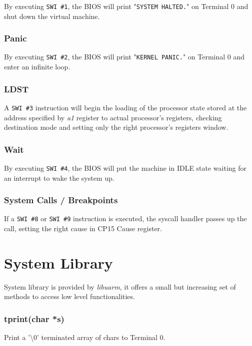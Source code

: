 By executing \texttt{SWI \#1}, the BIOS will print "\texttt{SYSTEM HALTED.}" on Terminal 0 and shut down the virtual machine.

\subsubsection{Panic}

By executing \texttt{SWI \#2}, the BIOS will print "\texttt{KERNEL PANIC.}" on Terminal 0 and enter an infinite loop.

\subsubsection{LDST}

A \texttt{SWI \#3} instruction will begin the loading of the processor state stored at the address specified by \emph{a1} register to actual processor's registers, checking destination mode and setting only the right processor's registers window.

\subsubsection{Wait}

By executing \texttt{SWI \#4}, the BIOS will put the machine in IDLE state waiting for an interrupt to wake the system up.

\subsubsection{System Calls / Breakpoints}

If a \texttt{SWI \#8} or \texttt{SWI \#9} instruction is executed, the syscall handler passes up the call, setting the right cause in CP15 Cause register.

\section{System Library}

System library is provided by \emph{libuarm}, it offers a small but increasing set of methods to access low level functionalities.

\subsubsection{tprint(char *s)}

Print a '\textbackslash0' terminated array of chars to Terminal 0.

